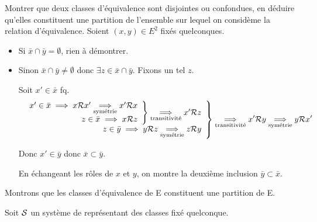 \documentclass{article}
\begin{document}
\begin{question_kholle}
  [Soit \Rel une relation d'équivalence sur $E$ et $x\in E$. \\
    La classe de $x$, notée $\bar{x}$, est l'ensemble des éléments de $E$ en relation avec x :
    $$
      \bar{x} = \left\{ y \in E \;|\; x \Rel y \right\}
    $$
  ]
  {Montrer que deux classes d’équivalence sont disjointes ou confondues, en déduire qu’elles constituent une partition de l’ensemble sur lequel on considème la relation d’équivalence.}
  Soient $(x, y) \in E^2$ fixés quelconques.
  \begin{itemize}[label=\textemdash]
    \item Si $\bar{x} \cap \bar{y} = \emptyset$, rien à démontrer.
    \item Sinon $\bar{x} \cap \bar{y} \neq \emptyset$ donc $\exists z \in \bar{x} \cap \bar{y}$. Fixons un tel $z$.

          Soit $x' \in \bar{x}$ fq.
          \begin{equation*}
            \left.
            \begin{array}{r}
              \left. \begin{array}{r}
                       x' \in \bar{x} \implies x \mathcal R x' \underset{\text{symétrie}}{\implies} x' \mathcal R x \\
                       z \in \bar{x} \implies x \mathcal R z
                     \end{array}
              \right\} \underset{\text{transitivité}}{\implies} x' \mathcal R z \\
              z \in \bar{y} \implies y \mathcal R z \underset{\text{symétrie}}{\implies} z \mathcal R y
            \end{array}
            \right\} \underset{\text{transitivité}}{\implies} x' \mathcal R y
            \underset{\text{symétrie}}{\implies} y \mathcal R x'
          \end{equation*}

          Donc $x' \in \bar{y}$ donc $\bar{x} \subset \bar{y}$.

          En échangeant les rôles de $x$ et $y$, on montre la deuxième inclusion $\bar{y} \subset \bar{x}$.
  \end{itemize}
  \bigbreak

  Montrons que les classes d'équivalence de E constituent une partition de E.

  Soit $\mathcal S$ un système de représentant des classes fixé quelconque.


\end{question_kholle}
\end{document}
